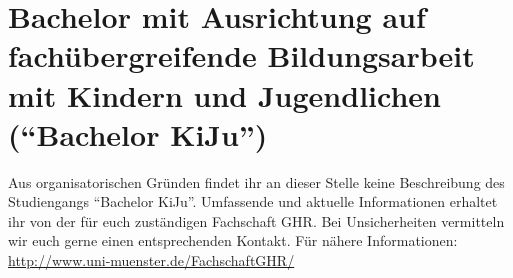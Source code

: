 \chapter*{Bachelor mit Ausrichtung auf fachübergreifende Bildungsarbeit mit Kindern und Jugendlichen ("`Bachelor KiJu"')}
Aus organisatorischen Gründen findet ihr an dieser Stelle keine Beschreibung des Studiengangs "`Bachelor KiJu"'. Umfassende und aktuelle Informationen erhaltet ihr von der für euch zuständigen Fachschaft GHR. Bei Unsicherheiten vermitteln wir euch gerne einen entsprechenden Kontakt. Für nähere Informationen:\\
\url{http://www.uni-muenster.de/FachschaftGHR/}


